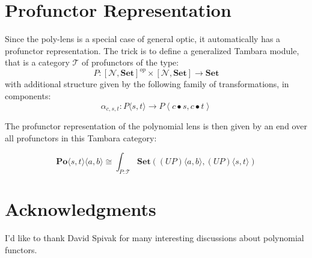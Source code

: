 \documentclass[11pt]{amsart}
\begin{document}
\section{Profunctor Representation}

Since the poly-lens is a special case of general optic, it automatically has a profunctor representation. The trick is to define a generalized Tambara module, that is a category $\mathcal{T}$ of profunctors of the type:
\[ P \colon [\mathcal{N}, \mathbf{Set}]^{op}  \times [\mathcal{N}, \mathbf{Set}] \to \mathbf{Set} \]
with additional structure given by the following family of transformations, in components:
\[\alpha_{c, s, t} \colon P\langle s, t \rangle \to P \left \langle c \bullet s, c \bullet t \right \rangle \]

The profunctor representation of the polynomial lens is then given by an end over all profunctors in this Tambara category:

\[  \mathbf{Po}\langle s, t\rangle \langle a, b\rangle \cong \int_{P \colon \mathcal{T}} \mathbf{Set}\left ( (U P)\langle a, b \rangle, (U P) \langle s, t \rangle \right) \]
\section{Acknowledgments}
I'd like to thank David Spivak for many interesting discussions about polynomial functors.
        
\end{document}
